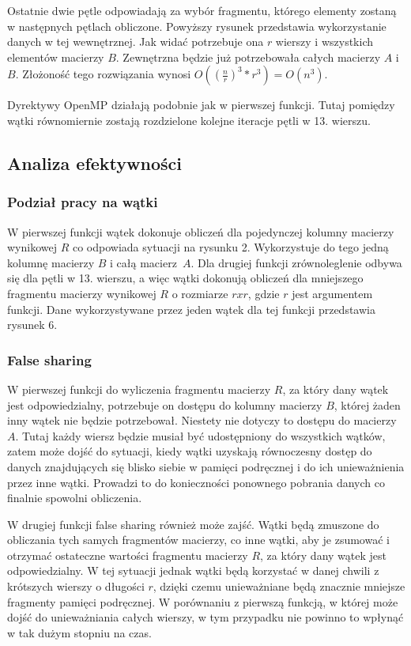 \documentclass{article}
\begin{document}
Ostatnie dwie pętle odpowiadają za wybór fragmentu, którego elementy zostaną w następnych pętlach obliczone. Powyższy rysunek przedstawia wykorzystanie danych w tej wewnętrznej. Jak widać potrzebuje ona $r$ wierszy i wszystkich elementów macierzy $B$. Zewnętrzna będzie już potrzebowała całych macierzy $A$ i $B$. Złożoność tego rozwiązania wynosi $O((\frac{n}{r})^3*r^3)=O(n^3)$.

Dyrektywy OpenMP działają podobnie jak w pierwszej funkcji. Tutaj pomiędzy wątki równomiernie zostają rozdzielone kolejne iteracje pętli w 13. wierszu.

\subsection{Analiza efektywności}
\subsubsection{Podział pracy na wątki}

W pierwszej funkcji wątek dokonuje obliczeń dla pojedynczej kolumny macierzy wynikowej $R$ co odpowiada sytuacji na rysunku 2. Wykorzystuje do tego jedną kolumnę macierzy $B$ i całą macierz~$A$. Dla drugiej funkcji zrównoleglenie odbywa się dla pętli w 13. wierszu, a więc wątki dokonują obliczeń dla mniejszego fragmentu macierzy wynikowej $R$ o rozmiarze $r x r$, gdzie $r$ jest argumentem funkcji. Dane wykorzystywane przez jeden wątek dla tej funkcji przedstawia rysunek 6.

\subsubsection{False sharing}

W pierwszej funkcji do wyliczenia fragmentu macierzy $R$, za który dany wątek jest odpowiedzialny, potrzebuje on dostępu do kolumny macierzy $B$, której żaden inny wątek nie będzie potrzebował. Niestety nie dotyczy to dostępu do macierzy $A$. Tutaj każdy wiersz będzie musiał być udostępniony do wszystkich wątków, zatem może dojść do sytuacji, kiedy wątki uzyskają równoczesny dostęp do danych znajdujących się blisko siebie w pamięci podręcznej i do ich unieważnienia przez inne wątki. Prowadzi to do konieczności ponownego pobrania danych co finalnie spowolni obliczenia.

W drugiej funkcji false sharing również może zajść. Wątki będą zmuszone do obliczania tych samych fragmentów macierzy, co inne wątki, aby je zsumować i otrzymać ostateczne wartości fragmentu macierzy $R$, za który dany wątek jest odpowiedzialny. W tej sytuacji jednak wątki będą korzystać w danej chwili z krótszych wierszy o długości $r$, dzięki czemu unieważniane będą znacznie mniejsze fragmenty pamięci podręcznej. W porównaniu z pierwszą funkcją, w której może dojść do unieważniania całych wierszy, w tym przypadku nie powinno to wpłynąć w tak dużym stopniu na czas. 
\end{document}

